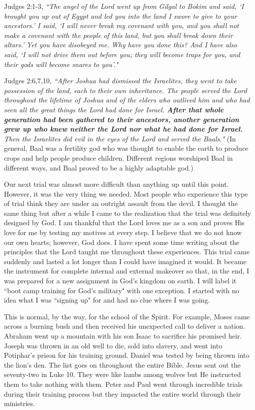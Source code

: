\documentclass[oneside,12pt]{book}
\begin{document}
Judges 2:1-3,  \textit{``The angel of the Lord went up from Gilgal to Bokim and said, `I brought you up out of Egypt and led you into the land I swore to give to your ancestors.' I said, `I will never break my covenant with you, and you shall not make a covenant with the people of this land, but you shall break down their altars.' Yet you have disobeyed me. Why have you done this? And I have also said, `I will not drive them out before you; they will become traps for you, and their gods will become snares to you'."}

Judges 2:6,7,10, \textit{``After Joshua had dismissed the Israelites, they went to take possession of the land, each to their own inheritance. The people served the Lord throughout the lifetime of Joshua and of the elders who outlived him and who had seen all the great things the Lord had done for Israel. \textbf{After that whole generation had been gathered to their ancestors, another generation grew up who knew neither the Lord nor what he had done for Israel.} Then the Israelites did evil in the eyes of the Lord and served the Baals."} (In general, Baal was a fertility god who was thought to enable the earth to produce crops and help people produce children. Different regions worshiped Baal in different ways, and Baal proved to be a highly adaptable god.)

Our next trial was almost more difficult than anything up until this point. However, it was the very thing we needed. Most people who experience this type of trial think they are under an outright assault from the devil. I thought the same thing but after a while I came to the realization that the trial was definitely designed by God. I am thankful that the Lord loves me as a son and proves His love for me by testing my motives at every step. I believe that we do not know our own hearts; however, God does. I have spent some time writing about the principles that the Lord taught me throughout these experiences. This trial came suddenly and lasted a lot longer than I could have imagined it would. It became the instrument for complete internal and external makeover so that, in the end, I was prepared for a new assignment in God's kingdom on earth. I will label it ``boot camp training for God's military" with one exception. I started with no idea what I was ``signing up" for and had no clue where I was going. 

This is normal, by the way, for the school of the Spirit. For example, Moses came across a burning bush and then received his unexpected call to deliver a nation. Abraham went up a mountain with his son Isaac to sacrifice his promised heir. Joseph was thrown in an old well to die, sold into slavery, and went into Potiphar's prison for his training ground. Daniel was tested by being thrown into the lion's den. The list goes on throughout the entire Bible. Jesus sent out the seventy-two in Luke 10. They were like lambs among wolves but He instructed them to take nothing with them. Peter and Paul went through incredible trials during their training process but they impacted the entire world through their ministries.
\end{document}
